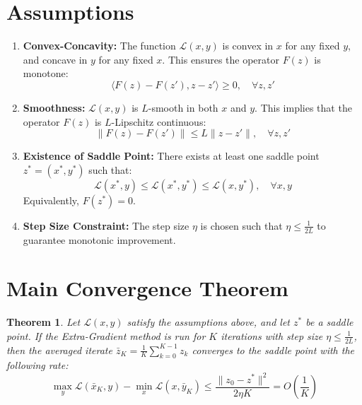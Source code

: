 \documentclass{article}
\newtheorem{theorem}{Theorem}
\begin{document}
\section*{Assumptions}
\begin{enumerate}
    \item \textbf{Convex-Concavity:} The function $\mathcal{L}(x, y)$ is convex in $x$ for any fixed $y$, and concave in $y$ for any fixed $x$. This ensures the operator $F(z)$ is monotone:
    $$ \langle F(z) - F(z'), z - z' \rangle \geq 0, \quad \forall z, z' $$
    \item \textbf{Smoothness:} $\mathcal{L}(x, y)$ is $L$-smooth in both $x$ and $y$. This implies that the operator $F(z)$ is $L$-Lipschitz continuous:
    $$ \|F(z) - F(z')\| \leq L \|z - z'\|, \quad \forall z, z' $$
    \item \textbf{Existence of Saddle Point:} There exists at least one saddle point $z^* = (x^*, y^*)$ such that:
    $$ \mathcal{L}(x^*, y) \leq \mathcal{L}(x^*, y^*) \leq \mathcal{L}(x, y^*), \quad \forall x, y $$
    Equivalently, $F(z^*) = 0$.
    \item \textbf{Step Size Constraint:} The step size $\eta$ is chosen such that $\eta \leq \frac{1}{2L}$ to guarantee monotonic improvement.
\end{enumerate}

\section*{Main Convergence Theorem}
\begin{theorem}
Let $\mathcal{L}(x,y)$ satisfy the assumptions above, and let $z^*$ be a saddle point. If the Extra-Gradient method is run for $K$ iterations with step size $\eta \leq \frac{1}{2L}$, then the averaged iterate $\bar{z}_K = \frac{1}{K} \sum_{k=0}^{K-1} z_k$ converges to the saddle point with the following rate:
$$ \max_{y} \mathcal{L}(\bar{x}_K, y) - \min_{x} \mathcal{L}(x, \bar{y}_K) \leq \frac{\|z_0 - z^*\|^2}{2 \eta K} = O\left(\frac{1}{K}\right) $$
\end{theorem}
\end{document}
